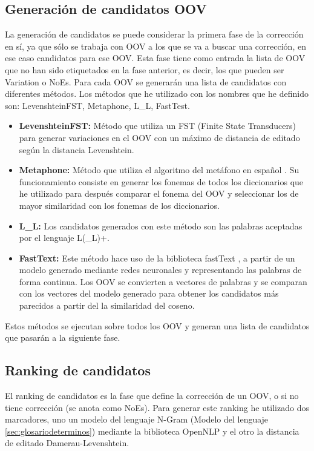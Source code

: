 \documentclass[spanish,12pt, a4paper,twoside]{paper}
\begin{document}
\subsection{Generación de candidatos OOV}\label{sec:generaciondecandidatosoov}
La generación de candidatos se puede considerar la primera fase de la corrección en sí, ya que sólo se trabaja con OOV a los que se va a buscar una corrección, en ese caso candidatos para ese OOV.
Esta fase tiene como entrada la lista de OOV que no han sido etiquetados en la fase anterior, es decir, los que pueden ser Variation o NoEs. Para cada OOV se generarán una lista de candidatos con diferentes métodos. Los métodos que he utilizado con los nombres que he definido son: LevenshteinFST, Metaphone, L\_L, FastTest.

\begin{itemize}
	\item \textbf{LevenshteinFST:} Método que utiliza un FST (Finite State Transducers) para generar variaciones en el OOV con un máximo de distancia de editado según la distancia Levenshtein.
	\item \textbf{Metaphone:} Método que utiliza el algoritmo del metáfono en español \cite{mosquera:2011}. Su funcionamiento consiste en generar los fonemas de todos los diccionarios que he utilizado para después comparar el fonema del OOV y seleccionar los de mayor similaridad con los fonemas de los diccionarios.
	\item \textbf{L\_L:} Los candidatos generados con este método son las palabras aceptadas por el lenguaje L(\_L)+.
	\item \textbf{FastText:} Este método hace uso de la biblioteca fastText \cite{facebook:fasttext}, a partir de un modelo generado mediante redes neuronales y representando las palabras de forma continua. Los OOV se convierten a vectores de palabras y se comparan con los vectores del modelo generado para obtener los candidatos más parecidos a partir del la similaridad del coseno.	
\end{itemize}

Estos métodos se ejecutan sobre todos los OOV y generan una lista de candidatos que pasarán a la siguiente fase.

\subsection{Ranking de candidatos}\label{sec:rankingdecandidatos}
El ranking de candidatos es la fase que define la corrección de un OOV, o si no tiene corrección (se anota como NoEs). Para generar este ranking he utilizado dos marcadores, uno un modelo del lenguaje N-Gram (Modelo del lenguaje \ref{sec:glosariodeterminos}) mediante la biblioteca OpenNLP \cite{opennlp} y el otro la distancia de editado Damerau-Levenshtein.\\
\end{document}
